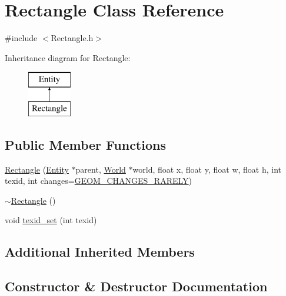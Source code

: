 \hypertarget{classRectangle}{}\section{Rectangle Class Reference}
\label{classRectangle}


{\ttfamily \#include $<$Rectangle.\+h$>$}

Inheritance diagram for Rectangle\+:\begin{figure}[H]
\begin{center}
\leavevmode
\includegraphics[height=2.000000cm]{classRectangle}
\end{center}
\end{figure}
\subsection*{Public Member Functions}
\begin{DoxyCompactItemize}
\item 
\mbox{\hyperlink{classRectangle_a483c8753dfaeda0fd70cc8b0076c14cb}{Rectangle}} (\mbox{\hyperlink{classEntity}{Entity}} $\ast$parent, \mbox{\hyperlink{classWorld}{World}} $\ast$world, float x, float y, float w, float h, int texid, int changes=\mbox{\hyperlink{World_8h_adf764cbdea00d65edcd07bb9953ad2b7afd62cb9ff74dd66a2597e9c31e205cba}{G\+E\+O\+M\+\_\+\+C\+H\+A\+N\+G\+E\+S\+\_\+\+R\+A\+R\+E\+LY}})
\item 
\mbox{\hyperlink{classRectangle_a494c076b13aadf26efdce07d23c61ddd}{$\sim$\+Rectangle}} ()
\item 
void \mbox{\hyperlink{classRectangle_a9f4fc658d7de3025befe7558b804dfec}{texid\+\_\+set}} (int texid)
\end{DoxyCompactItemize}
\subsection*{Additional Inherited Members}


\subsection{Constructor \& Destructor Documentation}
\mbox{\label{classRectangle_a483c8753dfaeda0fd70cc8b0076c14cb}} 
